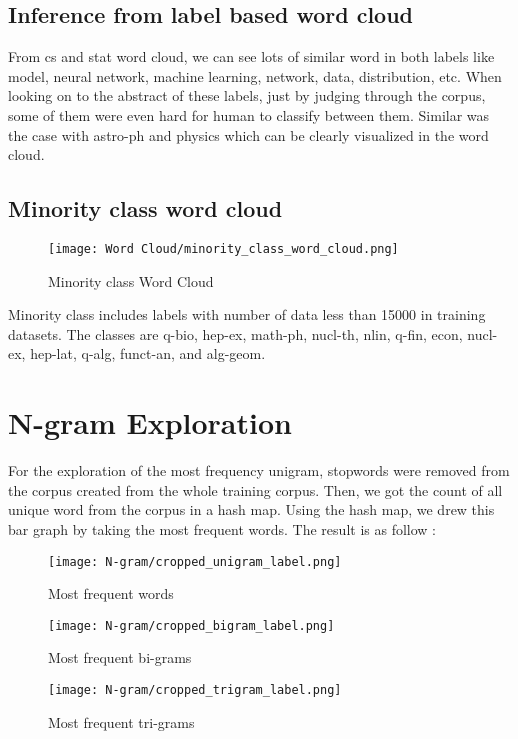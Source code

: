 \subsection{Inference from label based word cloud}
From cs and stat word cloud, we can see lots of similar word in both labels like model, neural network, machine learning, network, data, distribution, etc. When looking on to the abstract of these labels, just by judging through the corpus, some of them were even hard for human to classify between them. Similar was the case with astro-ph and  physics which can be clearly visualized in the word cloud.

\subsection{Minority class word cloud}
\begin{figure}[H]
    \centering
    \texttt{[image: Word Cloud/minority\_class\_word\_cloud.png]}
    \caption{Minority class Word Cloud}
    \label{fig:Minority class Corpus Word Cloud}
\end{figure}

Minority class includes labels with number of data less than 15000 in training datasets. The classes are q-bio, hep-ex,
math-ph, nucl-th, nlin, q-fin, econ, nucl-ex, hep-lat, q-alg, funct-an,
and alg-geom.

\section{N-gram Exploration}
For the exploration of the most frequency unigram, stopwords were removed from the corpus created from the whole training corpus. Then, we got the count of all unique word from the corpus in a hash map. Using the hash map, we drew this bar graph by taking the most frequent words. The result is as follow :

\begin{figure}[H]
    \centering
    \texttt{[image: N-gram/cropped\_unigram\_label.png]}
    \caption{Most frequent words}
    \label{fig:Most frequent words}
\end{figure}


\begin{figure}[H]
    \centering
    \texttt{[image: N-gram/cropped\_bigram\_label.png]}
    \caption{Most frequent bi-grams}
    \label{fig:Most frequent bi-grams}
\end{figure}

\begin{figure}[H]
    \centering
    \texttt{[image: N-gram/cropped\_trigram\_label.png]}
    \caption{Most frequent tri-grams}
    \label{fig:Most frequent tri-grams}
\end{figure}



